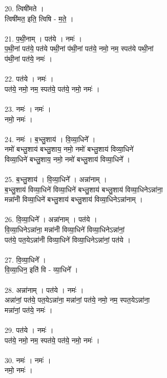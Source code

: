 20. त्विषी॑मते ।\\
त्विषी॑मत॒ इति॒ त्विषि - म॒ते॒ ।\\
\\
21. प॒थी॒नाम् । पत॑ये । नमः॑ ।\\
प॒थी॒नां पत॑ये॒ पत॑ये पथी॒नां प॑थी॒नां पत॑ये॒ नमो॒ नम॒ स्पत॑ये पथी॒नां\\
प॑थी॒नां पत॑ये॒ नमः॑ ।\\
\\
22. पत॑ये । नमः॑ ।\\
पत॑ये॒ नमो॒ नम॒ स्पत॑ये॒ पत॑ये॒ नमो॒ नमः॑ ।\\
\\
23. नमः॑ । नमः॑ ।\\
नमो॒ नमः॑ ।\\
\\
24. नमः॑ । ब॒भ्लु॒शाय॑ । वि॒व्या॒धिने᳚ ।\\
नमो॑ बभ्लु॒शाय॑ बभ्लु॒शाय॒ नमो॒ नमो॑ बभ्लु॒शाय॑ विव्या॒धिने॑\\
विव्या॒धिने॑ बभ्लु॒शाय॒ नमो॒ नमो॑ बभ्लु॒शाय॑ विव्या॒धिने᳚ ।\\
\\
25. ब॒भ्लु॒शाय॑ । वि॒व्या॒धिने᳚ । अन्ना॑नाम् ।\\
ब॒भ्लु॒शाय॑ विव्या॒धिने॑ विव्या॒धिने॑ बभ्लु॒शाय॑ बभ्लु॒शाय॑ विव्या॒धिनेऽन्ना॑ना॒\\
मन्ना॑नांँ विव्या॒धिने॑ बभ्लु॒शाय॑ बभ्लु॒शाय॑ विव्या॒धिनेऽन्ना॑नाम् ।\\
\\
26. वि॒व्या॒धिने᳚ । अन्ना॑नाम् । पत॑ये ।\\
वि॒व्या॒धिनेऽन्ना॑ना॒ मन्ना॑नांँ विव्या॒धिने॑ विव्या॒धिनेऽन्ना॑नां॒\\
पत॑ये॒ पत॒येऽन्ना॑नांँ विव्या॒धिने॑ विव्या॒धिनेऽन्ना॑नां॒ पत॑ये ।\\
\\
27. वि॒व्या॒धिने᳚ ।\\
वि॒व्या॒धिन॒ इति॑ वि - व्या॒धिने᳚ ।\\
\\
28. अन्ना॑नाम् । पत॑ये । नमः॑ ।\\
अन्ना॑नां॒ पत॑ये॒ पत॒येऽन्ना॑ना॒ मन्ना॑नां॒ पत॑ये॒ नमो॒ नम॒ स्पत॒येऽन्ना॑ना॒\\
मन्ना॑नां॒ पत॑ये॒ नमः॑ ।\\
\\
29. पत॑ये । नमः॑ ।\\
पत॑ये॒ नमो॒ नम॒ स्पत॑ये॒ पत॑ये॒ नमो॒ नमः॑ ।\\
\\
30. नमः॑ । नमः॑ ।\\
नमो॒ नमः॑ ।\\
